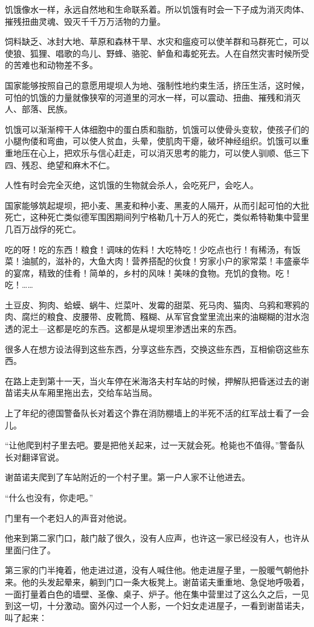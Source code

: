 饥饿像水一样，永远自然地和生命联系着。所以饥饿有时会一下子成为消灭肉体、摧残扭曲灵魂、毁灭千千万万活物的力量。

饲料缺乏、冰封大地、草原和森林干旱、水灾和瘟疫可以使羊群和马群死亡，可以使狼、狐狸、唱歌的鸟儿、野蜂、骆驼、鲈鱼和毒蛇死去。人在自然灾害时候所受的苦难也和动物差不多。

国家能够按照自己的意愿用堤坝人为地、强制性地约束生活，挤压生活，这时候，可怕的饥饿的力量就像狭窄的河道里的河水一样，可以震动、扭曲、摧残和消灭人、部落、民族。

饥饿可以渐渐榨干人体细胞中的蛋白质和脂肪，饥饿可以使骨头变软，使孩子们的小腿佝偻和弯曲，可以使人贫血，头晕，使肌肉干瘪，破坏神经组织。饥饿可以重重地压在心上，把欢乐与信心赶走，可以消灭思考的能力，可以使人驯顺、低三下四、残忍、绝望和麻木不仁。

人性有时会完全灭绝，这饥饿的生物就会杀人，会吃死尸，会吃人。

国家能够筑起堤坝，把小麦、黑麦和种小麦、黑麦的人隔开，从而引起可怕的大批死亡，这种死亡类似德军围困期间列宁格勒几十万人的死亡，类似希特勒集中营里几百万战俘的死亡。

吃的呀！吃的东西！粮食！调味的佐料！大吃特吃！少吃点也行！有稀汤，有饭菜！油腻的，滋补的，大鱼大肉！营养搭配的伙食！穷家小户的家常菜！丰盛豪华的宴席，精致的佳肴！简单的，乡村的风味！美味的食物。充饥的食物。吃！吃！……

土豆皮、狗肉、蛤蟆、蜗牛、烂菜叶、发霉的甜菜、死马肉、猫肉、乌鸦和寒鸦的肉、腐烂的粮食、皮腰带、皮靴筒、糨糊、从军官食堂里流出来的油糊糊的泔水泡透的泥土—这都是吃的东西。这都是从堤坝里渗透出来的东西。

很多人在想方设法得到这些东西，分享这些东西，交换这些东西，互相偷窃这些东西。

在路上走到第十一天，当火车停在米海洛夫村车站的时候，押解队把昏迷过去的谢苗诺夫从车厢里拖出去，交给车站当局。

上了年纪的德国警备队长对着这个靠在消防棚墙上的半死不活的红军战士看了一会儿。

“让他爬到村子里去吧。要是把他关起来，过一天就会死。枪毙也不值得。”警备队长对翻译官说。

谢苗诺夫爬到了车站附近的一个村子里。第一户人家不让他进去。

“什么也没有，你走吧。”

门里有一个老妇人的声音对他说。

他来到第二家门口，敲门敲了很久，没有人应声，也许这一家已经没有人，也许从里面闩住了。

第三家的门半掩着，他走进过道，没有人喊住他。他走进屋子里，一股暖气朝他扑来。他的头发起晕来，躺到门口一条大板凳上。谢苗诺夫重重地、急促地呼吸着，一面打量着白色的墙壁、圣像、桌子、炉子。他在集中营里过了这么久之后，一见到这一切，十分激动。窗外闪过一个人影，一个妇女走进屋子，一看到谢苗诺夫，叫了起来：

